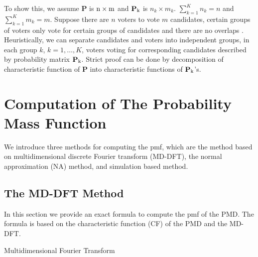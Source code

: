 \documentclass[12pt]{article}
\newcommand{\Pmat}{\mathbf{P}}
\begin{document}
To show this, we assume $\Pmat$ is $\rm n \times m$ and $\Pmat_{\rm k}$ is $n_k \times m_k$. $\sum_{k=1}^K n_k = n$ and $\sum_{k=1}^K m_k = m$. Suppose there are $n$ voters to vote $m$ candidates, certain groups of voters only vote for certain groups of candidates and there are no overlaps . Heuristically, we can separate candidates and voters into independent groups, in each group $k$, $k = 1,\dots,K$, voters voting for corresponding candidates described by probability matrix $\Pmat_{\rm k}$. Strict proof can be done by decomposition of characteristic function of $\Pmat$ into characteristic functions of $\Pmat_{\rm k}$'s.



\section{Computation of The Probability Mass Function}\label{sec:CA.driving.study}
We introduce three methods for computing the pmf, which are the method based on multidimensional discrete Fourier transform (MD-DFT), the normal approximation (NA) method, and simulation based method.

\subsection{The MD-DFT Method}
In this section we provide an exact formula to compute the pmf of the PMD. The formula is based on the characteristic function (CF) of the PMD and the MD-DFT.

Multidimensional Fourier Transform
\end{document}
